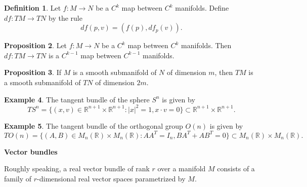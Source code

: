 \documentclass{amsart}
\numberwithin{equation}{section}
\newcommand{\bR}{\mathbb{R}}
\theoremstyle{definition}
\newtheorem{definition}{Definition} [section]
\newtheorem{example}[definition]{Example}
\theoremstyle{theorem}
\newtheorem{proposition}[definition]{Proposition}
\begin{document}
\begin{definition}
Let $f : M \to N$ be a $C^k$ map between $C^k$ manifolds. Define $df : TM \to TN$ by the rule 
\[
df(p,v) = (f(p), df_p(v)).
\]
\end{definition}

\begin{proposition}
Let $f : M \to N$ be a $C^k$ map between $C^k$ manifolds. Then $df : TM \to TN$ is a $C^{k-1}$ map
between $C^{k-1}$ manifolds.
\end{proposition}

\begin{proposition}
If $M$ is a smooth submanifold of $N$ of dimension $m$, then $TM$ is a smooth submanifold of $TN$ of dimension $2m$. 
\end{proposition}

\begin{example}
The tangent bundle of the sphere $S^n$ is given by 
\[
TS^n = \{(x,v) \in \bR^{n+1} \times \bR^{n+1} : |x|^2 = 1, x \cdot v = 0\} \subset \bR^{n+1}\times \bR^{n+1}.
\]
\end{example}

\begin{example}
The tangent bundle of the orthogonal group $O(n)$ is given by 
\[
TO(n) = \{(A,B) \in M_n(\bR) \times M_n(\bR) : AA^T = I_n, BA^T + AB^T = 0 \} \subset M_n(\bR)\times M_n(\bR).
\]
\end{example}

\noindent
{\bf \large Vector bundles}

Roughly speaking, a real vector bundle of rank $r$ over a manifold $M$ consists of a family of $r$-dimensional 
real vector spaces parametrized by $M$. 
\end{document}
